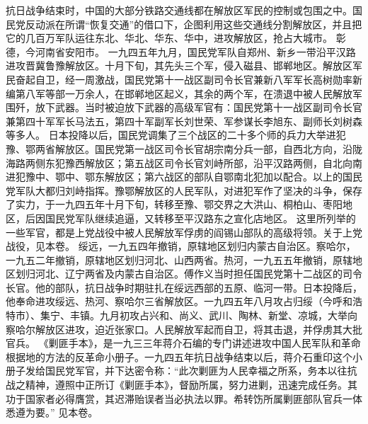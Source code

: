\begin{maonote}
抗日战争结束时，中国的大部分铁路交通线都在解放区军民的控制或包围之中。国民党反动派在所谓“恢复交通”的借口下，企图利用这些交通线分割解放区，并且把它的几百万军队运往东北、华北、华东、华中，进攻解放区，抢占大城市。
彰德，今河南省安阳市。
一九四五年九月，国民党军队自郑州、新乡一带沿平汉路进攻晋冀鲁豫解放区。十月下旬，其先头三个军，侵入磁县、邯郸地区。解放区军民奋起自卫，经一周激战，国民党第十一战区副司令长官兼新八军军长高树勋率新编第八军等部一万余人，在邯郸地区起义，其余的两个军，在溃退中被人民解放军围歼，放下武器。当时被迫放下武器的高级军官有：国民党第十一战区副司令长官兼第四十军军长马法五，第四十军副军长刘世荣、军参谋长李旭东、副师长刘树森等多人。
日本投降以后，国民党调集了三个战区的二十多个师的兵力大举进犯豫、鄂两省解放区。国民党第一战区司令长官胡宗南分兵一部，自西北方向，沿陇海路两侧东犯豫西解放区；第五战区司令长官刘峙所部，沿平汉路两侧，自北向南进犯豫中、鄂中、鄂东解放区；第六战区的部队自鄂南北犯加以配合。以上的国民党军队大都归刘峙指挥。豫鄂解放区的人民军队，对进犯军作了坚决的斗争，保存了实力，于一九四五年十月下旬，转移至豫、鄂交界之大洪山、桐柏山、枣阳地区，后因国民党军队继续追逼，又转移至平汉路东之宣化店地区。
这里所列举的一些军官，都是上党战役中被人民解放军俘虏的阎锡山部队的高级将领。关于上党战役，见本卷。
绥远，一九五四年撤销，原辖地区划归内蒙古自治区。察哈尔，一九五二年撤销，原辖地区划归河北、山西两省。热河，一九五五年撤销，原辖地区划归河北、辽宁两省及内蒙古自治区。傅作义当时担任国民党第十二战区的司令长官。他的部队，抗日战争时期驻扎在绥远西部的五原、临河一带。日本投降后，他奉命进攻绥远、热河、察哈尔三省解放区。一九四五年八月攻占归绥（今呼和浩特市）、集宁、丰镇。九月初攻占兴和、尚义、武川、陶林、新堂、凉城，大举向察哈尔解放区进攻，迫近张家口。人民解放军起而自卫，将其击退，并俘虏其大批官兵。
《剿匪手本》，是一九三三年蒋介石编的专门讲述进攻中国人民军队和革命根据地的方法的反革命小册子。一九四五年抗日战争结束以后，蒋介石重印这个小册子发给国民党军官，并下达密令称：“此次剿匪为人民幸福之所系，务本以往抗战之精神，遵照中正所订《剿匪手本》，督励所属，努力进剿，迅速完成任务。其功于国家者必得膺赏，其迟滞贻误者当必执法以罪。希转饬所属剿匪部队官兵一体悉遵为要。”
见本卷。
\end{maonote}
